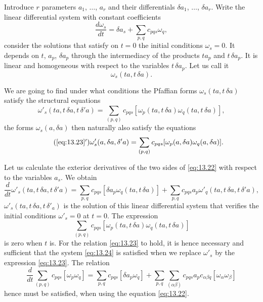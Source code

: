 \documentclass[leqno,11pt]{book}
\numberwithin{equation}{chapter}
\theoremstyle{shape1}
\theoremstyle{shapesmall}
\begin{document}
Introduce $r$ parameters $a_{1}$, $\dots$, $a_{r}$ and their differentials $\delta a_{1}$, $\dots$, $\delta a_{r}$. Write the linear differential system with constant coefficients
\begin{equation}
  \label{eq:13.22}
  \frac{d\omega_{s}}{dt}=\delta a_{s}+\sum_{p,q}c_{pqs}\omega_{q},
\end{equation}
consider the solutions that satisfy on $t=0$ the initial conditions $\omega_{s}=0$. It depends on $t$, $a_{p}$, $\delta a_{p}$ through the intermediacy of the products $ta_{p}$ and $t\,\delta a_{p}$. It is linear and homogeneous with respect to the variables $t\,\delta a_{p}$. Let us call it
\[
\omega_{s}(ta,t\,\delta a).
\]

We are going to find under what conditions the Pfaffian forms $\omega_{s}(ta,t\,\delta a)$ satisfy the structural equations
\begin{equation}
  \label{eq:13.23}
  \omega'_{s}(ta,t\,\delta a,t\,\delta'a)=\sum_{(p,q)}c_{pqs}[\omega_{p}(ta,t\,\delta a)\omega_{q}(ta,t\,\delta a)],
\end{equation}
the forms $\omega_{s}(a,\delta a)$ then naturally also satisfy the equations
\begin{equation}
  \label{eq:13.23'}\tag{\ref{eq:13.23}$'$}
  \omega'_{s}(a,\delta a,\delta' a)=\sum_{(p,q)}c_{pqs}[\omega_{p}(a,\delta a)\omega_{q}(a,\delta a)].
\end{equation}

Let us calculate the exterior derivatives of the two sides of \eqref{eq:13.22} with respect to the variables $a_{s}$. We obtain
\begin{equation}
  \label{eq:13.24}
    \frac{d}{dt}\omega'_{s}(ta,t\,\delta a,t\,\delta'a)
    =\sum_{p,q}c_{pqs}[\delta a_{p}\omega_{q}(ta,t\,\delta a)]+\sum_{p,q}c_{pqs}a_{p}\omega'_{q}(ta,t\,\delta a,t\,\delta'a),
\end{equation}
$\omega'_{s}(ta,t\,\delta a,t\,\delta'_{a})$ is the solution of this linear differential system that verifies the initial conditions $\omega'_{s}=0$ at $t=0$. The expression
\begin{equation}
  \label{eq:13.25}
  \sum_{(p,q)}c_{pqs}[\omega_{p}(ta,t\,\delta a)\omega_{q}(ta,t\,\delta a)]
\end{equation}
is zero when $t$ is. For the relation \eqref{eq:13.23} to hold, it is hence necessary and sufficient that the system \eqref{eq:13.24} is satisfied when we replace $\omega'_{s}$ by the expression \eqref{eq:13.23}. The relation
\begin{equation}
  \label{eq:13.26}
  \frac{d}{dt}\sum_{(p,q)}c_{pqs}[\omega_{p}\omega_{q}]=\sum_{p,q}c_{pqs}[\delta a_{p}\omega_{q}]+\sum_{p,q}\sum_{(\alpha\beta)}c_{pqs}a_{p}c_{\alpha\beta q}[\omega_{\alpha}\omega_{\beta}]
\end{equation}
hence must be satisfied, when using the equation \eqref{eq:13.22}.
\end{document}
